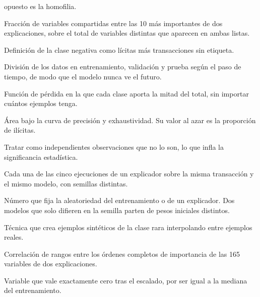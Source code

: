 \begin{description}
        opuesto es la homofilia.
  \item[Jaccard top-10.] Fracción de variables compartidas entre las 10 más importantes de dos
        explicaciones, sobre el total de variables distintas que aparecen en ambas listas.
  \item[Modo C.] Definición de la clase negativa como lícitas más transacciones sin etiqueta.
  \item[Partición temporal.] División de los datos en entrenamiento, validación y prueba según
        el paso de tiempo, de modo que el modelo nunca ve el futuro.
  \item[Pesos por clase.] Función de pérdida en la que cada clase aporta la mitad del total,
        sin importar cuántos ejemplos tenga.
  \item[PR-AUC.] Área bajo la curva de precisión y exhaustividad. Su valor al azar es la
        proporción de ilícitas.
  \item[Pseudorreplicación.] Tratar como independientes observaciones que no lo son, lo que
        infla la significancia estadística.
  \item[Réplica.] Cada una de las cinco ejecuciones de un explicador sobre la misma transacción
        y el mismo modelo, con semillas distintas.
  \item[Semilla.] Número que fija la aleatoriedad del entrenamiento o de un explicador. Dos
        modelos que solo difieren en la semilla parten de pesos iniciales distintos.
  \item[SMOTE.] Técnica que crea ejemplos sintéticos de la clase rara interpolando entre
        ejemplos reales.
  \item[Spearman global.] Correlación de rangos entre los órdenes completos de importancia de
        las 165 variables de dos explicaciones.
  \item[Variable nula.] Variable que vale exactamente cero tras el escalado, por ser igual a la
        mediana del entrenamiento.
\end{description}
